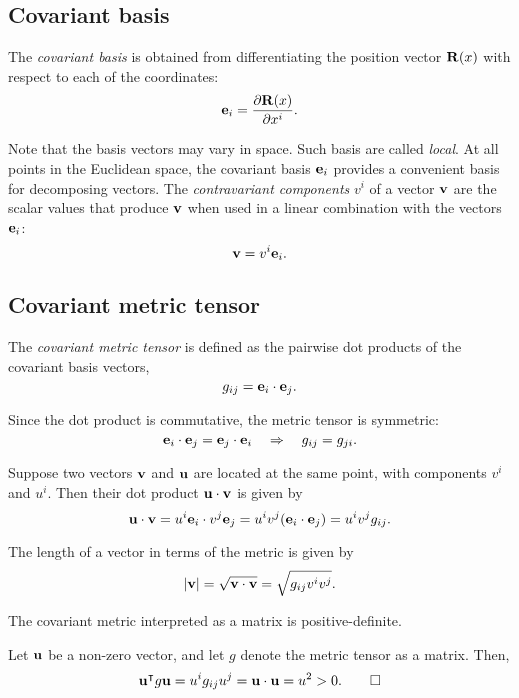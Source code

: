 \documentclass{article}
\begin{document}
	\subsection{Covariant basis}
	\begin{definition}
		The \textit{covariant basis} is obtained from differentiating the position vector $ \vb{R} (x)$ with respect to each of the coordinates:
		\begin{equation}
			\vb{e}_i = \pdv{\vb{R}(x)}{x^i}.
		\end{equation}
	\end{definition}
	Note that the basis vectors may vary in space. Such basis are called \textit{local}. At all points in the Euclidean space, the covariant basis $ \vb{e}_i $ provides a convenient basis for decomposing vectors. The \textit{contravariant components} $ v^i $ of a vector $ \vb{v} $ are the scalar values that produce $ \vb{v} $ when used in a linear combination with the vectors $ \vb{e}_i $:
	\begin{equation}
		\vb{v} = v^i \vb{e}_i.
	\end{equation}
	\subsection{Covariant metric tensor}
	\begin{definition}
		The \textit{covariant metric tensor} is defined as the pairwise dot products of the covariant  basis vectors,
		\begin{equation}
			g_{ij} = \vb{e}_i \cdot \vb{e}_j.
		\end{equation}
	\end{definition}
	\begin{corollary}
		Since the dot product is commutative, the metric tensor is symmetric:
		\[
		\vb{e}_i \cdot \vb{e}_j = \vb{e}_j \cdot \vb{e}_i  \quad \Rightarrow \quad g_{ij} = g_{ji}.
		\]
	\end{corollary}
	\begin{proposition}
		Suppose two vectors $ \vb{v} $ and $ \vb{u} $ are located at the same point, with components $ v^i $ and $ u^{i} $. Then their dot product $ \vb{u} \cdot \vb{v} $ is given by
		\begin{equation}
			\vb{u} \cdot \vb{v} = u^{i} \vb{e}_i \cdot v^{j} \vb{e}_j = u^{i} v^{j} (\vb{e}_i \cdot \vb{e}_j) = u^{i} v^{j} g_{ij}.
		\end{equation}
	\end{proposition}
	\begin{corollary}
		The length of a vector in terms of the metric is given by
		\[
		\abs{\vb{v}} = \sqrt{\vb{v} \cdot \vb{v}}=  \sqrt{g_{ij} v^{i} v^{j}}.
		\]
	\end{corollary}
	\begin{proposition}
		The covariant metric interpreted as a matrix is positive-definite.
	\end{proposition}
	\proof Let $ \vb{u} $ be a non-zero vector, and let $ g $ denote the metric tensor as a matrix. Then,
	\[
	\vb{u}^{\intercal} g \vb{u} = u^{i} g_{ij} u^{j} = \vb{u} \cdot \vb{u} = u^2 > 0. \qed
	\]
\end{document}
